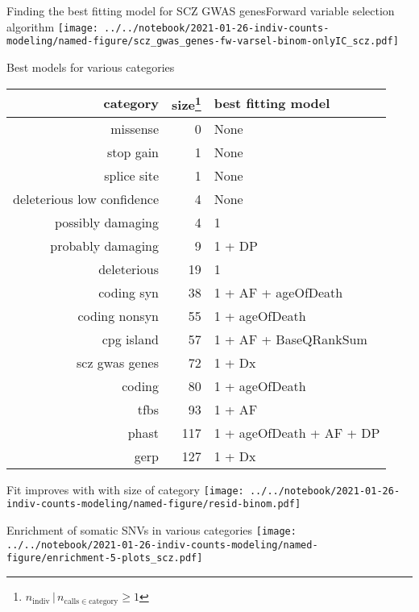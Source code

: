 \documentclass[usenames,dvipsnames]{beamer}
\begin{document}
\begin{frame}{Finding the best fitting model for SCZ GWAS genes}{Forward variable selection algorithm}
\texttt{[image: ../../notebook/2021-01-26-indiv-counts-modeling/named-figure/scz\_gwas\_genes-fw-varsel-binom-onlyIC\_scz.pdf]}
\end{frame}

\begin{frame}{Best models for various categories}
\begin{center}
\tiny
\begin{tabular}{rrl}
\hline
category  & size\footnote{\(n_\mathrm{indiv} \,|\, n_{\mathrm{calls} \in
			\mathrm{category}} \ge 1\)} & best fitting model  \\
\hline
missense & 0 & None \\
stop gain & 1 & None \\
splice site & 1 & None \\
deleterious low confidence & 4 & None \\
possibly damaging & 4 & 1 \\
probably damaging & 9 & 1 + DP \\
deleterious & 19 & 1 \\
coding syn & 38 & 1 + AF + ageOfDeath \\
coding nonsyn & 55 & 1 + ageOfDeath \\
cpg island & 57 & 1 + AF + BaseQRankSum \\
scz gwas genes & 72 & 1 + Dx \\
coding & 80 & 1 + ageOfDeath \\
tfbs & 93 & 1 + AF \\
phast & 117 & 1 + ageOfDeath + AF + DP \\
gerp & 127 & 1 + Dx \\
\hline
\end{tabular}
\end{center}
\end{frame}

\begin{frame}{Fit improves with with size of category}
\texttt{[image: ../../notebook/2021-01-26-indiv-counts-modeling/named-figure/resid-binom.pdf]}
\end{frame}

\begin{frame}{Enrichment of somatic SNVs in various categories}
\texttt{[image: ../../notebook/2021-01-26-indiv-counts-modeling/named-figure/enrichment-5-plots\_scz.pdf]}
\end{frame}
\end{document}
